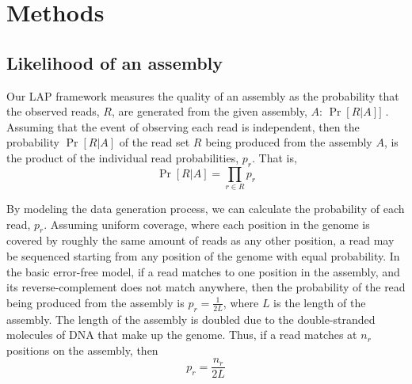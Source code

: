 

\section{Methods}
\subsection{Likelihood of an assembly}

Our LAP framework measures the quality of an assembly as the probability that the observed reads, $R$, are generated from the given assembly, $A$: $\Pr[R|A]]$ \cite{LAP}.
Assuming that the event of observing each read is independent, then the probability $\Pr[R|A]$ of the read set $R$ being produced from the assembly $A$, is the product of the individual read probabilities, $p_r$.  That is,
\begin{equation}
  \label{probability_reads_given_assembly}
  \Pr[R \vert A]=\prod_{r \in R} p_r
\end{equation}

By modeling the data generation process, we can calculate the probability of each read, $p_r$.
Assuming uniform coverage, where each position in the genome is covered by roughly the same amount of reads as any other position, a read may be sequenced starting from any position of the genome with equal probability.
In the basic error-free model, if a read matches to one position in the assembly, and its reverse-complement does not match anywhere, then the probability of the read being produced from the assembly is $p_r=\frac{1}{2L}$, where $L$ is the length of the assembly.
The length of the assembly is doubled due to the double-stranded molecules of DNA that make up the genome.
Thus, if a read 
matches at $n_r$ positions on the assembly, then
\begin{equation}
  \label{error_free_probability}
  p_r = \frac{n_r}{2L}
\end{equation}

